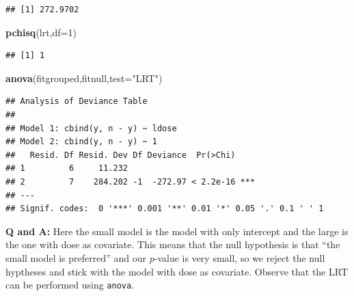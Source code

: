 \documentclass[
  ignorenonframetext,
]{beamer}
\newenvironment{Shaded}{\begin{snugshade}}{\end{snugshade}}
\newcommand{\AttributeTok}[1]{\textcolor[rgb]{0.13,0.29,0.53}{#1}}
\newcommand{\CommentTok}[1]{\textcolor[rgb]{0.56,0.35,0.01}{\textit{#1}}}
\newcommand{\DecValTok}[1]{\textcolor[rgb]{0.00,0.00,0.81}{#1}}
\newcommand{\FunctionTok}[1]{\textcolor[rgb]{0.13,0.29,0.53}{\textbf{#1}}}
\newcommand{\NormalTok}[1]{#1}
\newcommand{\OtherTok}[1]{\textcolor[rgb]{0.56,0.35,0.01}{#1}}
\newcommand{\SpecialCharTok}[1]{\textcolor[rgb]{0.81,0.36,0.00}{\textbf{#1}}}
\newcommand{\StringTok}[1]{\textcolor[rgb]{0.31,0.60,0.02}{#1}}
\begin{document}
\begin{frame}[fragile]
\begin{Shaded}
\end{Shaded}

\begin{verbatim}
## [1] 272.9702
\end{verbatim}

\begin{Shaded}
\begin{Highlighting}[]
\FunctionTok{pchisq}\NormalTok{(lrt,}\AttributeTok{df=}\DecValTok{1}\NormalTok{)}
\end{Highlighting}
\end{Shaded}

\begin{verbatim}
## [1] 1
\end{verbatim}

\begin{Shaded}
\begin{Highlighting}[]
\FunctionTok{anova}\NormalTok{(fitgrouped,fitnull,}\AttributeTok{test=}\StringTok{"LRT"}\NormalTok{)}
\end{Highlighting}
\end{Shaded}

\begin{verbatim}
## Analysis of Deviance Table
## 
## Model 1: cbind(y, n - y) ~ ldose
## Model 2: cbind(y, n - y) ~ 1
##   Resid. Df Resid. Dev Df Deviance  Pr(>Chi)    
## 1         6     11.232                          
## 2         7    284.202 -1  -272.97 < 2.2e-16 ***
## ---
## Signif. codes:  0 '***' 0.001 '**' 0.01 '*' 0.05 '.' 0.1 ' ' 1
\end{verbatim}

\textbf{Q and A:} Here the small model is the model with only intercept
and the large is the one with dose as covariate. This means that the
null hypothesis is that ``the small model is preferred'' and our
\(p\)-value is very small, so we reject the null hyptheses and stick
with the model with dose as covariate. Observe that the LRT can be
performed using \texttt{anova}.
\end{frame}
\end{document}

